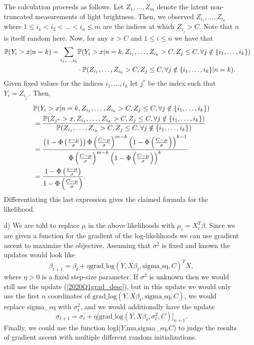 \begin{enumerate}
The calculation proceeds as follows. Let $Z_1,\dots,Z_m$ denote the latent non-truncated measurements of light brightness. Then, we observed $Z_{i_1},\dots,Z_{i_n}$ where $1 \leq i_1<i_2<\dots < i_n \leq m$ are the indices at which $Z_{i_j}  > C$. Note that $n$ is itself random here. Now, for any $x > C$ and $1 \leq i \leq n$ we have that  
\begin{align*}
 \mathbb{P}(Y_i > x | n = k)  = \sum_{i_1,\dots,i_k}  & \mathbb{P}(Y_i > x | n=k, Z_{i_1},\dots,Z_{i_k} > C, Z_j \leq C, \forall j \notin \{i_1,\dots,i_k\} )\\
& \cdot \mathbb{P}(Z_{i_1},\dots,Z_{i_k} > C, Z_j \leq C, \forall j \notin \{i_1,\dots,i_k\}|n=k) .
\end{align*}
Given fixed values for the indices $i_1,\dots,i_k$ let $j^*$ be the index such that $Y_i = Z_{i_{j^*}}$. Then,
\begin{align*}
& \mathbb{P}(Y_i > x | n=k, Z_{i_1},\dots,Z_{i_k} > C, Z_j \leq C, \forall j \notin \{i_1,\dots,i_k\} )\\
 & =  \frac{\mathbb{P}(Z_{j^*} > x, Z_{i_1},\dots,Z_{i_k} > C, Z_j \leq C, \forall j \notin \{i_1,\dots,i_k\} )}{\mathbb{P}(  Z_{i_1},\dots,Z_{i_k} > C, Z_j \leq C, \forall j \notin \{i_1,\dots,i_k\} )}\\
 & =  \frac{\left(1-\Phi\left( \frac{x-\mu}{\sigma}\right)\right)  \Phi\left( \frac{C-\mu}{\sigma}\right)^{m-k}   \left( 1- \Phi\left( \frac{C-\mu}{\sigma}\right)\right)^{k - 1} }{\Phi\left( \frac{C-\mu}{\sigma}\right)^{m-k}  \left(1- \Phi\left( \frac{C-\mu}{\sigma}\right)\right)^{k}} \\
 & = \frac{1-\Phi\left( \frac{x-\mu}{\sigma}\right) }{1-\Phi\left( \frac{C-\mu}{\sigma}\right) }.
\end{align*}
Differentiating this last expression gives the claimed formula for the likelihood.
\item[d)]
We are told to replace $\mu$ in the above likelihoods with $\mu_i = X_i^T\beta$. Since we are given a function for the gradient of the log-likelihoods we can use gradient ascent to maximize the objective. Assuming that $\sigma^2$ is fixed and known the updates would look like 
\begin{equation}\label{2020Q1grad_desc}
\beta_{t+1} = \beta_t + \eta \text{grad\_log}(Y,X\beta_t,\text{sigma\_sq},C)^TX,
\end{equation}
where $\eta > 0$ is a fixed step-size parameter. If $\sigma^2$ is unknown then we would still use the update (\ref{2020Q1grad_desc}), but in this update we would only use the first $n$ coordinates of $\text{grad\_log}(Y,X\beta_t,\text{sigma\_sq},C)$, we would replace sigma\_sq with $\sigma^2_t$, and we would additionally have the update
\[
\sigma_{t+1} = \sigma_t + \eta \Big[ \text{grad\_log}(Y,X\beta_t,\sigma^2_t,C) \Big]_{n+1}.
\]
Finally, we could use the function logl($Y$,mu,sigma\_sq,$C$) to judge the results of gradient ascent with multiple different random initializations.
\end{enumerate}

